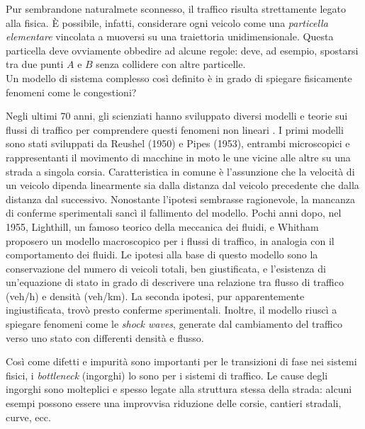 \documentclass[../main.tex]{subfiles}
\begin{document}
Pur sembrandone naturalmete sconnesso, il traffico risulta strettamente legato alla fisica.
\`E possibile, infatti, considerare ogni veicolo come una \emph{particella elementare} vincolata a muoversi su una traiettoria unidimensionale.
Questa particella deve ovviamente obbedire ad alcune regole: deve, ad esempio, spostarsi tra due punti $A$ e $B$ senza collidere con altre particelle.\\
Un modello di sistema complesso cos\`i definito \`e in grado di spiegare fisicamente fenomeni come le congestioni?

Negli ultimi 70 anni, gli scienziati hanno sviluppato diversi modelli e teorie sui flussi di traffico per comprendere questi fenomeni non lineari \cite{bs2004physics}.
I primi modelli sono stati sviluppati da Reushel (1950) e Pipes (1953), entrambi microscopici e rappresentanti il movimento di macchine in moto le une vicine alle altre su una strada a singola corsia.
Caratteristica in comune \`e l'assunzione che la velocit\`a di un veicolo dipenda linearmente sia dalla distanza dal veicolo precedente che dalla distanza dal successivo.
Nonostante l'ipotesi sembrasse ragionevole, la mancanza di conferme sperimentali sanc\`i il fallimento del modello.
Pochi anni dopo, nel 1955, Lighthill, un famoso teorico della meccanica dei fluidi, e Whitham proposero un modello macroscopico per i flussi di traffico, in analogia con il comportamento dei fluidi.
Le ipotesi alla base di questo modello sono la conservazione del numero di veicoli totali, ben giustificata, e l'esistenza di un'equazione di stato in grado di descrivere una relazione tra flusso di traffico (veh/h) e densit\`a (veh/km).
La seconda ipotesi, pur apparentemente ingiustificata, trov\`o presto conferme sperimentali.
Inoltre, il modello riusc\`i a spiegare fenomeni come le \emph{shock waves}, generate dal cambiamento del traffico verso uno stato con differenti densit\`a e flusso. 

Cos\`i come difetti e impurit\`a sono importanti per le transizioni di fase nei sistemi fisici, i \emph{bottleneck} (ingorghi) lo sono per i sistemi di traffico.
Le cause degli ingorghi sono molteplici e spesso legate alla struttura stessa della strada: alcuni esempi possono essere una improvvisa riduzione delle corsie, cantieri stradali, curve, ecc.
\end{document}
